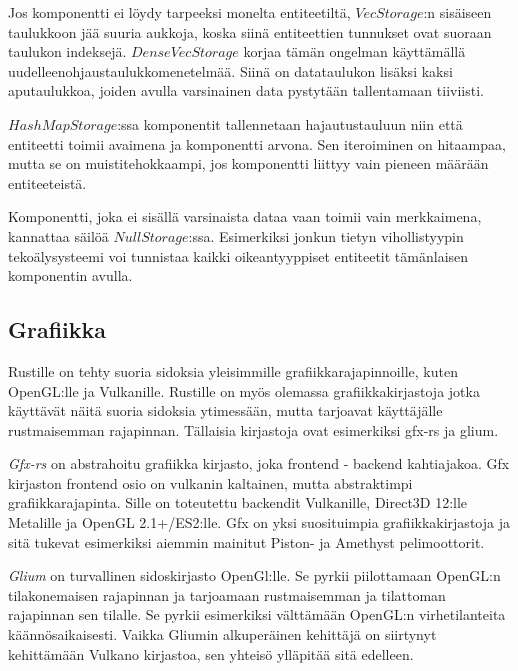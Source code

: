 \documentclass[finnish]{tktltiki2}
\theoremstyle{definition}
\theoremstyle{remark}
\begin{document}
Jos komponentti ei löydy tarpeeksi monelta entiteetiltä, $VecStorage$:n sisäiseen taulukkoon jää suuria aukkoja, koska siinä entiteettien tunnukset ovat suoraan taulukon indeksejä. $DenseVecStorage$ korjaa tämän ongelman käyttämällä uudelleenohjaustaulukkomenetelmää. Siinä on datataulukon lisäksi kaksi aputaulukkoa, joiden avulla varsinainen data pystytään tallentamaan tiiviisti.

$HashMapStorage$:ssa komponentit tallennetaan hajautustauluun niin että entiteetti toimii avaimena ja komponentti arvona. Sen iteroiminen on hitaampaa, mutta se on muistitehokkaampi, jos komponentti liittyy vain pieneen määrään entiteeteistä.  

Komponentti, joka ei sisällä varsinaista dataa vaan toimii vain merkkaimena, kannattaa säilöä $NullStorage$:ssa. Esimerkiksi jonkun tietyn vihollistyypin tekoälysysteemi voi tunnistaa kaikki oikeantyyppiset entiteetit tämänlaisen komponentin avulla. 

\subsection{Grafiikka}

Rustille on tehty suoria sidoksia yleisimmille grafiikkarajapinnoille, kuten OpenGL:lle ja Vulkanille. Rustille on myös olemassa grafiikkakirjastoja jotka käyttävät näitä suoria sidoksia ytimessään, mutta tarjoavat käyttäjälle rustmaisemman rajapinnan. Tällaisia kirjastoja ovat esimerkiksi gfx-rs ja glium.

\textit{Gfx-rs} on abstrahoitu grafiikka kirjasto, joka frontend - backend kahtiajakoa. Gfx kirjaston frontend osio on vulkanin kaltainen, mutta abstraktimpi grafiikkarajapinta. Sille on toteutettu backendit Vulkanille, Direct3D 12:lle Metalille ja OpenGL 2.1+/ES2:lle. Gfx on yksi suosituimpia grafiikkakirjastoja ja sitä tukevat esimerkiksi aiemmin mainitut Piston- ja Amethyst pelimoottorit.

\textit{Glium} on turvallinen sidoskirjasto OpenGl:lle. Se pyrkii piilottamaan OpenGL:n tilakonemaisen rajapinnan ja tarjoamaan rustmaisemman ja tilattoman rajapinnan sen tilalle. Se pyrkii esimerkiksi välttämään OpenGL:n virhetilanteita käännösaikaisesti. Vaikka Gliumin alkuperäinen kehittäjä on siirtynyt kehittämään Vulkano kirjastoa, sen yhteisö ylläpitää sitä edelleen.





% 
\end{document}
